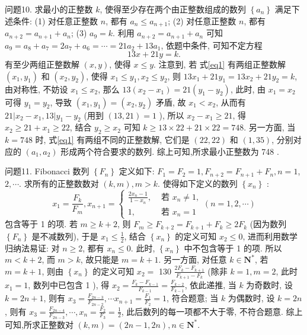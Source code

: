 问题10. 求最小的正整数 $k$, 使得至少存在两个由正整数组成的数列 $\left\{a_n\right\}$ 满足下述条件:
(1) 对任意正整数 $n$, 都有 $a_n \leqslant a_{n+1}$;
(2) 对任意正整数 $n$, 都有 $a_{n+2}=a_{n+1}+a_n$;
(3) $a_9=k$.
利用 $a_{n+2}=a_{n+1}+a_n$ 可知 $a_9=a_8+a_7=2 a_7+a_6=\cdots=21 a_2+13 a_1$, 依题中条件, 可知不定方程
$$
13 x+21 y=k . \label{eq1}
$$
有至少两组正整数解 $(x, y)$, 使得 $x \leqslant y$.
注意到, 若 式\ref{eq1} 有两组正整数解 $\left(x_1, y_1\right)$ 和 $\left(x_2, y_2\right)$, 使得 $x_1 \leqslant y_1, x_2 \leqslant y_2$, 则 $13 x_1+21 y_1=13 x_2+21 y_2=k$, 由对称性, 不妨设 $x_1 \leqslant x_2$, 那么 $13\left(x_2-\right. \left.x_1\right)=21\left(y_1-y_2\right)$, 此时, 由 $x_1=x_2$ 可得 $y_1=y_2$, 导致 $\left(x_1, y_1\right)=\left(x_2, y_2\right)$ 矛盾, 故 $x_1<x_2$, 从而有 $21\left|x_2-x_1, 13\right| y_1-y_2$ (用到 $(13,21)=1$ ), 所以 $x_2- x_1 \geqslant 21$, 得 $x_2 \geqslant 21+x_1 \geqslant 22$, 结合 $y_2 \geqslant x_2$ 可知 $k \geqslant 13 \times 22+21 \times 22=748$.
另一方面, 当 $k=748$ 时, 式\ref{eq1} 有两组不同的正整数解, 它们是 $(22,22)$ 和 $(1,35)$, 分别对应的 $\left(a_1, a_2\right)$ 形成两个符合要求的数列.
综上可知,所求最小正整数为 748 .



问题11. Fibonacci 数列 $\left\{F_n\right\}$ 定义如下: $F_1=F_2=1, F_{n+2}=F_{n+1}+F_n, n=1$, $2, \cdots$. 求所有的正整数数对 $(k, m), m>k$. 使得如下定义的数列 $\left\{x_n\right\}$ :
$$
x_1=\frac{F_k}{F_m}, x_{n+1}=\left\{\begin{array}{ll}
\frac{2 x_n-1}{1-x_n}, & \text { 若 } x_n \neq 1, \\
1, & \text { 若 } x_n=1
\end{array}(n=1,2, \cdots)\right.
$$
包含等于 1 的项.
若 $m \geqslant k+2$, 则 $F_m \geqslant F_{k+2}=F_{k+1}+F_k \geqslant 2 F_k$ (因为数列 $\left\{F_n\right\}$ 是不减数列), 于是 $x_1 \leqslant \frac{1}{2}$, 结合 $\left\{x_n\right\}$ 的定义可知 $x_2 \leqslant 0$, 进而利用数学归纳法易证: 对 $n \geqslant 2$, 都有 $x_n \leqslant 0$. 此时, $\left\{x_n\right\}$ 中不包含等于 1 的项.
所以 $m<k+2$, 而 $m>k$, 故只能是 $m=k+1$.
另一方面, 对任意 $k \in \mathbf{N}^*$, 若 $m=k+1$, 则由 $\left\{x_n\right\}$ 的定义可知 $x_2=$
130 $\frac{2 F_k-F_{k+1}}{F_{k+1}-F_k}$ (除非 $k=1, m=2$, 此时 $x_1=1$, 数列中已包含 1 ), 得 $x_2= \frac{F_k-F_{k-1}}{F_{k-1}}=\frac{F_{k-2}}{F_{k-1}}$, 依此递推, 当 $k$ 为奇数时, 设 $k=2 n+1$, 则有 $x_3=\frac{F_{2 n-3}}{F_{2 n-2}}, \cdots x_{n+1}=\frac{F_1}{F_2}=1$, 符合题意; 当 $k$ 为偶数时, 设 $k=2 n$, 则有 $x_3=\frac{F_{2 n-4}}{F_{2 n-3}}, \cdots, x_n= \frac{F_2}{F_3}=\frac{1}{2}$, 此后数列的每一项都不大于零, 不符合题意.
综上可知,所求正整数对 $(k, m)=(2 n-1,2 n), n \in \mathbf{N}^*$.



